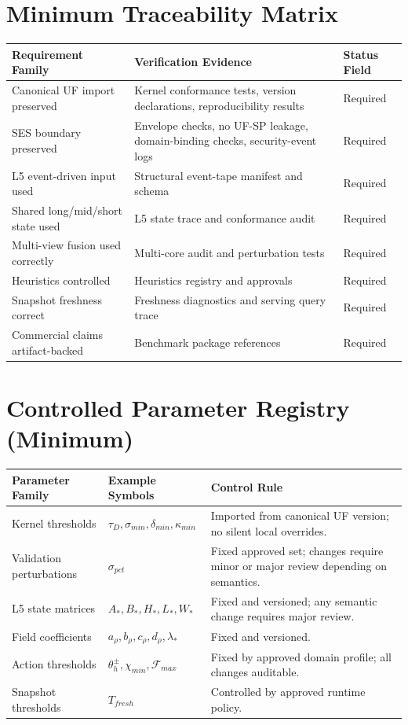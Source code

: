 \documentclass[11pt]{report}
\begin{document}
\appendix
\chapter{Minimum Traceability Matrix}
\begin{longtable}{p{}p{}p{}}
\toprule
Requirement Family & Verification Evidence & Status Field \\
\midrule
Canonical UF import preserved & Kernel conformance tests, version declarations, reproducibility results & Required \\
SES boundary preserved & Envelope checks, no UF-SP leakage, domain-binding checks, security-event logs & Required \\
L5 event-driven input used & Structural event-tape manifest and schema & Required \\
Shared long/mid/short state used & L5 state trace and conformance audit & Required \\
Multi-view fusion used correctly & Multi-core audit and perturbation tests & Required \\
Heuristics controlled & Heuristics registry and approvals & Required \\
Snapshot freshness correct & Freshness diagnostics and serving query trace & Required \\
Commercial claims artifact-backed & Benchmark package references & Required \\
\bottomrule
\end{longtable}

\chapter{Controlled Parameter Registry (Minimum)}
\begin{longtable}{p{}p{}p{}}
\toprule
Parameter Family & Example Symbols & Control Rule \\
\midrule
Kernel thresholds & $\tau_D,\sigma_{min},\delta_{min},\kappa_{min}$ & Imported from canonical UF version; no silent local overrides. \\
Validation perturbations & $\sigma_{pct}$ & Fixed approved set; changes require minor or major review depending on semantics. \\
L5 state matrices & $A_*,B_*,H_*,L_*,W_*$ & Fixed and versioned; any semantic change requires major review. \\
Field coefficients & $a_\rho,b_\rho,c_\rho,d_\rho,\lambda_*$ & Fixed and versioned. \\
Action thresholds & $\theta_h^{\pm},\chi_{min},\mathcal{F}_{max}$ & Fixed by approved domain profile; all changes auditable. \\
Snapshot thresholds & $T_{fresh}$ & Controlled by approved runtime policy. \\
\bottomrule
\end{longtable}
\end{document}
